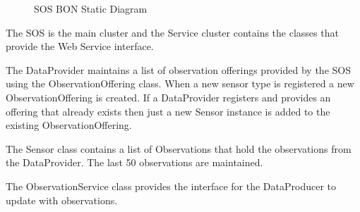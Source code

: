 \documentclass[]{final_report}
\begin{document}
 \begin{figure}[h!]
\centering
{}
\caption{SOS BON Static Diagram}\label{fig:bon_static_diagam_provider.png}
\end{figure}
The SOS is the main cluster and the Service cluster contains the classes that provide the Web Service interface.

The DataProvider maintains a list of observation offerings provided by the SOS using the ObservationOffering class. When a new sensor type is registered a new ObservationOffering is created. If a DataProvider registers and provides an offering that already exists then just a new Sensor instance is added to the existing ObservationOffering.
 
The Sensor class contains a list of Observations that hold the observations from the DataProvider. The last 50 observations are maintained.

The ObservationService class provides the interface for the DataProducer to update with observations.
\end{document}
